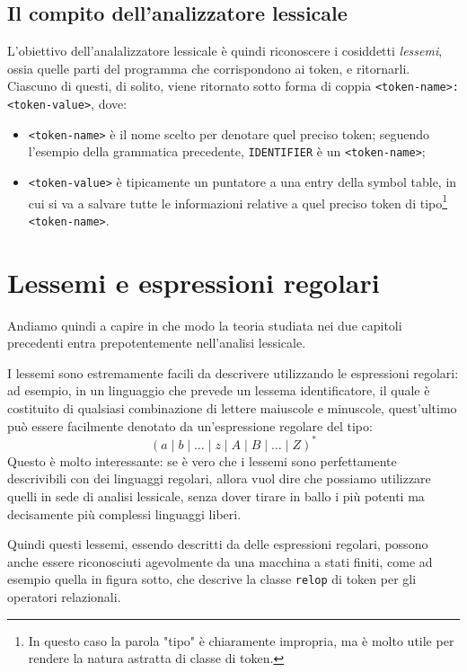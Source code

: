 \documentclass[class=book, crop=false, oneside, 12pt]{standalone}
\begin{document}
\subsection{Il compito dell'analizzatore lessicale}
L'obiettivo dell'analalizzatore lessicale è quindi riconoscere i cosiddetti \emph{lessemi}, ossia quelle parti del programma che corrispondono ai token, e ritornarli. Ciascuno di questi, di solito, viene ritornato sotto forma di coppia \texttt{<token-name>: <token-value>}, dove:
\begin{itemize}
    \item \texttt{<token-name>} è il nome scelto per denotare quel preciso token; seguendo l'esempio della grammatica precedente, \texttt{IDENTIFIER} è un \texttt{<token-name>};
    \item \texttt{<token-value>} è tipicamente un puntatore a una entry della symbol table, in cui si va a salvare tutte le informazioni relative a quel preciso token di tipo\footnote{In questo caso la parola "tipo" è chiaramente impropria, ma è molto utile per rendere la natura astratta di classe di token.} \texttt{<token-name>}.
\end{itemize}

\section{Lessemi e espressioni regolari}
Andiamo quindi a capire in che modo la teoria studiata nei due capitoli precedenti entra prepotentemente nell'analisi lessicale.

I lessemi sono estremamente facili da descrivere utilizzando le espressioni regolari: ad esempio, in un linguaggio che prevede un lessema identificatore, il quale è costituito di qualsiasi combinazione di lettere maiuscole e minuscole, quest'ultimo può essere facilmente denotato da un'espressione regolare del tipo:
\begin{equation*}
    (a \mid b \mid \ldots \mid z \mid A \mid B \mid \ldots \mid Z)^*
\end{equation*}
Questo è molto interessante: se è vero che i lessemi sono perfettamente descrivibili con dei linguaggi regolari, allora vuol dire che possiamo utilizzare quelli in sede di analisi lessicale, senza dover tirare in ballo i più potenti ma decisamente più complessi linguaggi liberi.

Quindi questi lessemi, essendo descritti da delle espressioni regolari, possono anche essere riconosciuti agevolmente da una macchina a stati finiti, come ad esempio quella in figura sotto, che descrive la classe \texttt{relop} di token per gli operatori relazionali.
\end{document}
